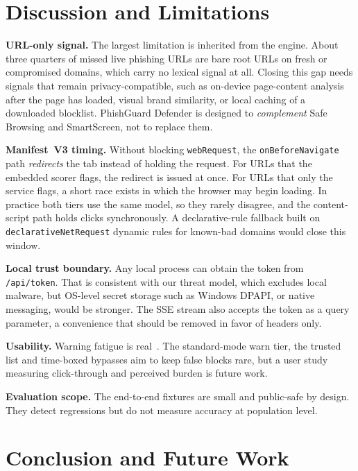 \documentclass[conference]{IEEEtran}
\newcommand{\sys}{PhishGuard Defender}
\newcommand{\code}[1]{\texttt{\small #1}}
\begin{document}
\section{Discussion and Limitations}
\label{sec:discussion}

\textbf{URL-only signal.} The largest limitation is inherited from the
engine. About three quarters of missed live phishing URLs are bare root
URLs on fresh or compromised domains, which carry no lexical signal at all.
Closing this gap needs signals that remain privacy-compatible, such as
on-device page-content analysis after the page has loaded, visual brand
similarity, or local caching of a downloaded blocklist. \sys{} is designed to
\emph{complement} Safe Browsing and SmartScreen, not to replace them.

\textbf{Manifest~V3 timing.} Without blocking \code{webRequest}, the
\code{onBeforeNavigate} path \emph{redirects} the tab instead of holding the
request. For URLs that the embedded scorer flags, the redirect is issued at
once. For URLs that only the service flags, a short race exists in which the
browser may begin loading. In practice both tiers use the same model, so they
rarely disagree, and the content-script path holds clicks synchronously. A
declarative-rule fallback built on \code{declarativeNetRequest} dynamic rules
for known-bad domains would close this window.

\textbf{Local trust boundary.} Any local process can obtain the token from
\code{/api/token}. That is consistent with our threat model, which excludes
local malware, but OS-level secret storage such as Windows DPAPI, or native
messaging, would be stronger. The SSE stream also accepts the token as a query
parameter, a convenience that should be removed in favor of headers only.

\textbf{Usability.} Warning fatigue is real~\cite{akhawe2013}. The
standard-mode warn tier, the trusted list and time-boxed bypasses aim to keep
false blocks rare, but a user study measuring click-through and perceived
burden is future work.

\textbf{Evaluation scope.} The end-to-end fixtures are small and
public-safe by design. They detect regressions but do not measure accuracy at
population level.

\section{Conclusion and Future Work}
\label{sec:conclusion}
\end{document}
